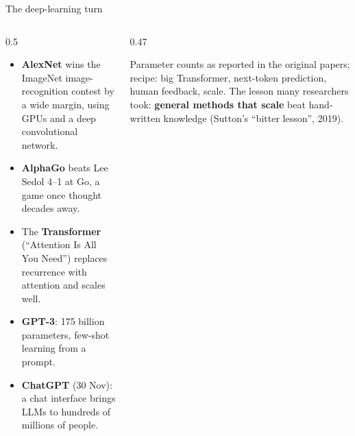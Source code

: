 \begin{frame}{The deep-learning turn}
\begin{columns}[T]
\begin{column}{0.5\textwidth}
\small
\begin{itemize}\setlength\itemsep{4pt}
\item[\key{2012}] \textbf{AlexNet} wins the ImageNet image-recognition contest by a wide margin, using GPUs and a deep convolutional network.
\item[\key{2016}] \textbf{AlphaGo} beats Lee Sedol 4--1 at Go, a game once thought decades away.
\item[\key{2017}] The \textbf{Transformer} (``Attention Is All You Need'') replaces recurrence with attention and scales well.
\item[\key{2020}] \textbf{GPT-3}: 175 billion parameters, few-shot learning from a prompt.
\item[\key{2022}] \textbf{ChatGPT} (30 Nov): a chat interface brings LLMs to hundreds of millions of people.
\end{itemize}
\end{column}
\begin{column}{0.47\textwidth}
\begin{sfig}[0.42]
\end{sfig}
{\scriptsize Parameter counts as reported in the original papers; recipe: big Transformer, next-token prediction, human feedback, scale.}
{\small The lesson many researchers took: \textbf{general methods that scale} beat hand-written knowledge (Sutton's ``bitter lesson'', 2019).}
\end{column}
\end{columns}
\end{frame}

